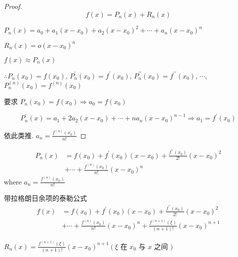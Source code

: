 \begin{proof}
    $$ f(x)=P_{n}(x)+R_{n}(x) $$
    
    $ P_{n}(x)=a_{0}+a_{1}\left(x-x_{0}\right)+a_{2}\left(x-x_{0}\right)^{2}+\cdots+a_{n}\left(x-x_{0}\right)^{n}  $

    $ R_{n}(x)=o\left(x-x_{0}\right)^{n} $

    $ f(x) \approx P_{n}(x) $

    $\therefore  P_{n}\left(x_{0}\right)=f\left(x_{0}\right) $,
    $ P_{n}^{\prime}\left(x_{0}\right)=f^{\prime}\left(x_{0}\right) $,
    $ P_{n}^{\prime \prime}\left(x_{0}\right)=f^{\prime \prime}\left(x_{0}\right) $,
    $ \cdots  $,
    $ P_{n}^{(n)}\left(x_{0}\right)=f^{(n)}\left(x_{0}\right) $

    要求 $ P_{n}\left(x_{0}\right)=f\left(x_{0}\right) \Rightarrow  a_{0}=f\left(x_{0}\right)  $

    $$ P_{n}^{\prime}(x)=a_{1}+2 a_{2}\left(x-x_{0}\right)+\cdots+n a_{n}\left(x-x_{0}\right)^{n-1} \Rightarrow  a_{1}=f^{\prime}\left(x_{0}\right)  $$

    依此类推. $a_{n}=\frac{f^{(n)}\left(x_{0}\right)}{n !} $
\end{proof}

\begin{corollary}[n阶泰勒多项式]
    $$ \begin{aligned} P_{n}(x) &=f\left(x_{0}\right)+f^{\prime}\left(x_{0}\right)\left(x-x_{0}\right)+\frac{f^{\prime \prime}\left(x_{0}\right)}{2 !}\left(x-x_{0}\right)^{2} \\ &+\cdots+\frac{f^{(n)}\left(x_{0}\right)}{n !}\left(x-x_{0}\right)^{n} \end{aligned} $$
    where $a_{n}=\frac{f^{(n)}\left(x_{0}\right)}{n !} $
\end{corollary}

\begin{corollary}[对于高阶余项的公式]
    带拉格朗日余项的泰勒公式
    $$ \begin{aligned} f(x) &=f\left(x_{0}\right)+f^{\prime}\left(x_{0}\right)\left(x-x_{0}\right)+\frac{f^{\prime \prime}\left(x_{0}\right)}{2 !}\left(x-x_{0}\right)^{2} \\ &+\cdots+\frac{f^{(n)}\left(x_{0}\right)}{n !}\left(x-x_{0}\right)^{n}+\frac{f^{(n+1)}(\xi)}{(n+1) !}\left(x-x_{0}\right)^{n+1} \end{aligned} $$

    $ R_{n}(x)=\frac{f^{(n+1)}(\xi)}{(n+1) !}\left(x-x_{0}\right)^{n+1}\left(\xi\right. $ 在 $ x_{0} $ 与 $ x  $ 之间 $ ) $
\end{corollary}

